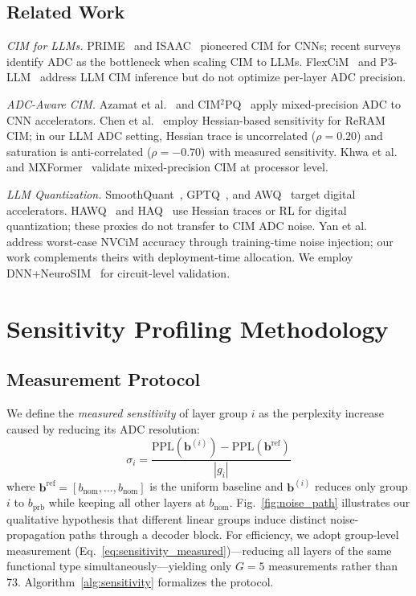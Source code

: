 \documentclass[sigconf,review,anonymous]{acmart}
\begin{document}
\subsection{Related Work}

\textit{CIM for LLMs.}
PRIME~\cite{chi2016prime} and ISAAC~\cite{shafiee2016isaac} pioneered CIM for CNNs; recent surveys~\cite{wolters2024memory} identify ADC as the bottleneck when scaling CIM to LLMs.
FlexCiM~\cite{flexcim2025} and P3-LLM~\cite{p3llm2025} address LLM CIM inference but do not optimize per-layer ADC precision.

\textit{ADC-Aware CIM.}
Azamat et al.~\cite{azamat2023partial} and CIM$^2$PQ~\cite{sun2024cim2pq} apply mixed-precision ADC to CNN accelerators.
Chen et al.~\cite{chen2025sensitivity} employ Hessian-based sensitivity for ReRAM CIM; in our LLM ADC setting, Hessian trace is uncorrelated ($\rho{=}0.20$) and saturation is anti-correlated ($\rho{=}{-}0.70$) with measured sensitivity.
Khwa et al.~\cite{khwa2025nature_mixed_cim} and MXFormer~\cite{mxformer2025} validate mixed-precision CIM at processor level.

\textit{LLM Quantization.}
SmoothQuant~\cite{xiao2023smoothquant}, GPTQ~\cite{frantar2022gptq}, and AWQ~\cite{lin2023awq} target digital accelerators.
HAWQ~\cite{dong2019hawq} and HAQ~\cite{wang2019haq} use Hessian traces or RL for digital quantization; these proxies do not transfer to CIM ADC noise.
Yan et al.~\cite{yan2023nvcim} address worst-case NVCiM accuracy through training-time noise injection; our work complements theirs with deployment-time allocation.
We employ DNN+NeuroSIM~\cite{chen2018neurosim,peng2019dnn,lee2024neurosim} for circuit-level validation.

\FloatBarrier
\section{Sensitivity Profiling Methodology}
\label{sec:sensitivity}

\subsection{Measurement Protocol}

We define the \emph{measured sensitivity} of layer group $i$ as the perplexity increase caused by reducing its ADC resolution:
\begin{equation}
  \sigma_i = \frac{\text{PPL}(\mathbf{b}^{(i)}) - \text{PPL}(\mathbf{b}^\text{ref})}{|g_i|}
  \label{eq:sensitivity_measured}
\end{equation}
where $\mathbf{b}^\text{ref} = [b_\text{nom}, \ldots, b_\text{nom}]$ is the uniform baseline and $\mathbf{b}^{(i)}$ reduces only group $i$ to $b_\text{prb}$ while keeping all other layers at $b_\text{nom}$.
Fig.~\ref{fig:noise_path} illustrates our qualitative hypothesis that different linear groups induce distinct noise-propagation paths through a decoder block.
For efficiency, we adopt group-level measurement (Eq.~\ref{eq:sensitivity_measured})---reducing all layers of the same functional type simultaneously---yielding only $G = 5$ measurements rather than 73.
Algorithm~\ref{alg:sensitivity} formalizes the protocol.
\end{document}
